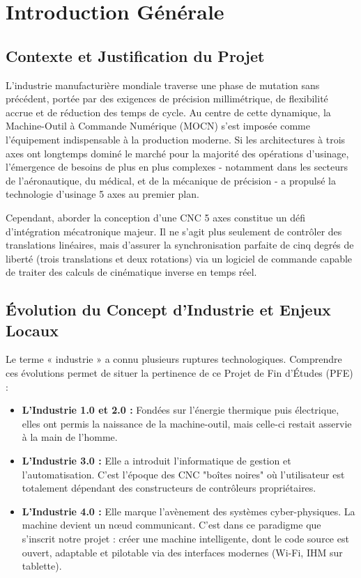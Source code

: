 \chapter*{Introduction Générale}
\label{chap:intro}

\section*{Contexte et Justification du Projet}
L'industrie manufacturière mondiale traverse une phase de mutation sans précédent, portée par des exigences de précision millimétrique, de flexibilité accrue et de réduction des temps de cycle. Au centre de cette dynamique, la Machine-Outil à Commande Numérique (MOCN) s'est imposée comme l'équipement indispensable à la production moderne. Si les architectures à trois axes ont longtemps dominé le marché pour la majorité des opérations d'usinage, l'émergence de besoins de plus en plus complexes - notamment dans les secteurs de l'aéronautique, du médical, et de la mécanique de précision - a propulsé la technologie d'usinage 5 axes au premier plan.

Cependant, aborder la conception d'une CNC 5 axes constitue un défi d'intégration mécatronique majeur. Il ne s'agit plus seulement de contrôler des translations linéaires, mais d'assurer la synchronisation parfaite de cinq degrés de liberté (trois translations et deux rotations) via un logiciel de commande capable de traiter des calculs de cinématique inverse en temps réel.

\section*{Évolution du Concept d'Industrie et Enjeux Locaux}
Le terme « industrie » a connu plusieurs ruptures technologiques. Comprendre ces évolutions permet de situer la pertinence de ce Projet de Fin d'Études (PFE) :
\begin{itemize}
    \item \textbf{L'Industrie 1.0 et 2.0 :} Fondées sur l'énergie thermique puis électrique, elles ont permis la naissance de la machine-outil, mais celle-ci restait asservie à la main de l'homme.
    \item \textbf{L'Industrie 3.0 :} Elle a introduit l'informatique de gestion et l'automatisation. C'est l'époque des CNC "boîtes noires" où l'utilisateur est totalement dépendant des constructeurs de contrôleurs propriétaires.
    \item \textbf{L'Industrie 4.0 :} Elle marque l'avènement des systèmes cyber-physiques. La machine devient un nœud communicant. C'est dans ce paradigme que s'inscrit notre projet : créer une machine intelligente, dont le code source est ouvert, adaptable et pilotable via des interfaces modernes (Wi-Fi, IHM sur tablette).
\end{itemize}

